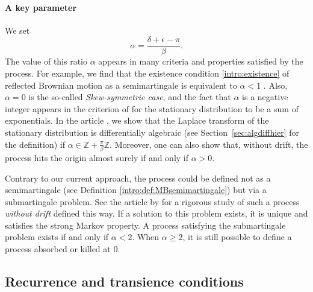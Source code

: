 \documentclass[11pt]{article}
\newcommand\citeS[1]{\cite{#1}}
\newcommand{\citet}[2][]{%
  \if\relax\detokenize{#1}\relax
    \cite{#2}%
  \else
    \cite[#1]{#2}%
  \fi
}
\newcommand{\dd}{\,\mathrm{d}}
\theoremstyle{definition}
\begin{document}
\paragraph{A key parameter}
We set
\begin{equation}
\label{intro:def:alpha}
\alpha=\frac{\delta+\epsilon-\pi}{\beta}.
\end{equation}
The value of this ratio $\alpha$ appears in many criteria and properties satisfied by the process.
For example, we find that the existence condition \eqref{intro:existence} of reflected Brownian motion as a semimartingale is equivalent to $\alpha<1$ \cite{Williams-85}.  
Also, $\alpha=0$ is the so-called \textit{Skew-symmetric case}, and the fact that $\alpha$ is a negative integer appears in the criterion of \citet{dieker_reflected_2009} for the stationary distribution to be a sum of exponentials.  
In the article \citeS{franceschi_bousquet_melou_price_hardouin_raschel_stationary_2023}, we show that the Laplace transform of the stationary distribution is differentially algebraic (see Section~\ref{sec:algdiffhier} for the definition) if $\alpha \in \mathbb{Z}+\frac{\pi}{\beta}\mathbb{Z}$.
Moreover, one can also show that, without drift, the process hits the origin almost surely if and only if $\alpha>0$.

Contrary to our current approach, the process could be defined not as a semimartingale (see Definition \ref{intro:def:MBsemimartingale}) but via a submartingale problem.  
See the article by \citet{varadhan_brownian_1985} for a rigorous study of such a process \textit{without drift} defined this way.  
If a solution to this problem exists, it is unique and satisfies the strong Markov property.  
A process satisfying the submartingale problem exists if and only if $\alpha< 2$.
When $\alpha \geqslant 2$, it is still possible to define a process absorbed or killed at $0$.









\subsection{Recurrence and transience conditions}
\label{intro:subsec:recurrence}
\end{document}
